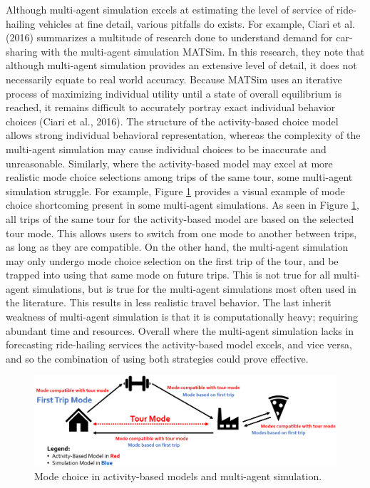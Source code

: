 \documentclass[fancy, masters]{byuthesis}
\begin{document}
Although multi-agent simulation excels at estimating the level of service of ride-hailing vehicles at fine detail, various pitfalls do exists. For example, Ciari et al. (2016) summarizes a multitude of research done to understand demand for car-sharing with the multi-agent simulation MATSim. In this research, they note that although multi-agent simulation provides an extensive level of detail, it does not necessarily equate to real world accuracy. Because MATSim uses an iterative process of maximizing individual utility until a state of overall equilibrium is reached, it remains difficult to accurately portray exact individual behavior choices (Ciari et al., 2016). The structure of the activity-based choice model allows strong individual behavioral representation, whereas the complexity of the multi-agent simulation may cause individual choices to be inaccurate and unreasonable. Similarly, where the activity-based model may excel at more realistic mode choice selections among trips of the same tour, some multi-agent simulation struggle. For example, Figure \ref{fig:fig-mode-compare} provides a visual example of mode choice shortcoming present in some multi-agent simulations. As seen in Figure \ref{fig:fig-mode-compare}, all trips of the same tour for the activity-based model are based on the selected tour mode. This allows users to switch from one mode to another between trips, as long as they are compatible. On the other hand, the multi-agent simulation may only undergo mode choice selection on the first trip of the tour, and be trapped into using that same mode on future trips. This is not true for all multi-agent simulations, but is true for the multi-agent simulations most often used in the literature. This results in less realistic travel behavior. The last inherit weakness of multi-agent simulation is that it is computationally heavy; requiring abundant time and resources. Overall where the multi-agent simulation lacks in forecasting ride-hailing services the activity-based model excels, and vice versa, and so the combination of using both strategies could prove effective.

\begin{figure}

{\centering \includegraphics[width=1\linewidth,]{pics/abm-mas-compare} 

}

\caption[Activity-based models vs. multi-agent simulation.]{Mode choice in activity-based models and multi-agent simulation.}\label{fig:fig-mode-compare}
\end{figure}
\end{document}
